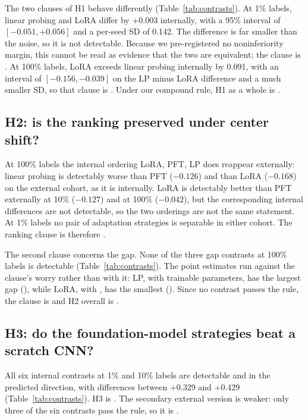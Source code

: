 \documentclass[conference,a4paper]{IEEEtran}
\begin{document}
The two clauses of H1 behave differently (Table~\ref{tab:contrasts}). At 1\%
labels, linear probing and LoRA differ by +0.003 internally, with a 95\%
interval of $[-0.051, +0.056]$ and a per-seed SD of 0.142. The difference is far
smaller than the noise, so it is not detectable. Because we pre-registered no
noninferiority margin, this cannot be read as evidence that the two are
equivalent; the clause is \valVerdictHOneLPNotWorseThanLoRAAtOnePct. At 100\%
labels, LoRA exceeds linear probing internally by 0.091, with an interval of
$[-0.156, -0.039]$ on the LP minus LoRA difference and a much smaller SD, so
that clause is \valVerdictHOneLoRABeatsLPAtHundredPct. Under our compound rule,
H1 as a whole is \textbf{\valVerdictHOne}.

\subsection{H2: is the ranking preserved under center shift?}

At 100\% labels the internal ordering LoRA, PFT, LP does reappear externally:
linear probing is detectably worse than PFT ($-0.126$) and than LoRA ($-0.168$)
on the external cohort, as it is internally. LoRA is detectably better than PFT
externally at 10\% ($-0.127$) and at 100\% ($-0.042$), but the corresponding
internal differences are not detectable, so the two orderings are not the same
statement. At 1\% labels no pair of adaptation strategies is separable in either
cohort. The ranking clause is therefore
\valVerdictHTwoRankingPreservedExternally.

The second clause concerns the gap. None of the three gap contrasts at 100\%
labels is detectable (Table~\ref{tab:contrasts}). The point estimates run
against the clause's worry rather than with it: LP, with \valParamsLP trainable
parameters, has the largest gap (\valMainLPHundredGapMean), while LoRA, with
\valParamsLoRA, has the smallest (\valMainLoRAHundredGapMean). Since no contrast
passes the rule, the clause is
\valVerdictHTwoGapDoesNotGrowWithTrainableParameters and H2 overall is
\textbf{\valVerdictHTwo}.

\subsection{H3: do the foundation-model strategies beat a scratch CNN?}

All six internal contrasts at 1\% and 10\% labels are detectable and in the
predicted direction, with differences between +0.329 and +0.429
(Table~\ref{tab:contrasts}). H3 is \textbf{\valVerdictHThree}. The secondary
external version is weaker: only three of the six contrasts pass the rule, so it
is \valVerdictHThreeExternal.
\end{document}
